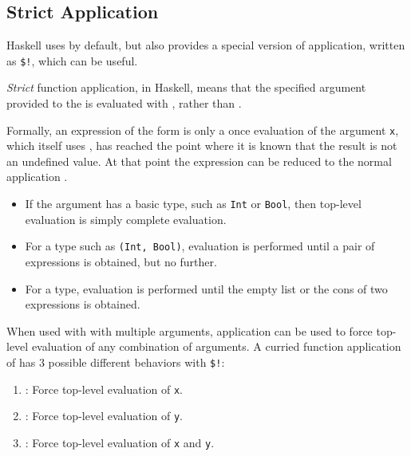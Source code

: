 \subsection{Strict Application}\label{subsec:Strict_Application}
Haskell uses  by default, but also provides a special  version of  application, written as \texttt{\$!}, which can be useful.

\begin{definition}[Strict]\label{def:Strict}
  \emph{Strict} function application, in Haskell, means that the specified argument provided to the  is evaluated with , rather than .

  Formally, an expression of the form  is only a  once evaluation of the argument \texttt{x}, which itself uses , has reached the point where it is known that the result is not an undefined value.
  At that point the expression can be reduced to the normal application .
\end{definition}

\begin{itemize}[noitemsep]
\item If the argument has a basic type, such as \texttt{Int} or \texttt{Bool}, then top-level evaluation is simply complete evaluation.
\item For a  type such as \texttt{(Int, Bool)}, evaluation is performed until a pair of expressions is obtained, but no further.
\item For a  type, evaluation is performed until the empty list or the cons of two expressions is obtained.
\end{itemize}

When used with  with multiple arguments,  application can be used to force top-level evaluation of any combination of arguments.
A curried function application of  has 3 possible different behaviors with \texttt{\$!}:
\begin{enumerate}[noitemsep]
\item {}: Force top-level evaluation of \texttt{x}.
\item {}: Force top-level evaluation of \texttt{y}.
\item {}: Force top-level evaluation of \texttt{x} and \texttt{y}.
\end{enumerate}


